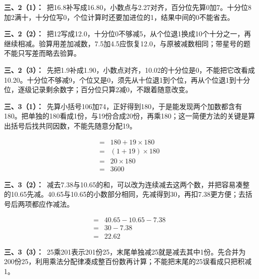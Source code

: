 \documentclass[multi=snippet,border=0pt]{standalone}
\newenvironment{snippet}[3]{\begin{minipage}{#1bp}\color{answerred}\fontsize{#2}{#3}\selectfont\raggedright}{\end{minipage}}
\begin{document}
\begin{snippet}{505}{11.5}{14}\textbf{三、2（1）：}\ 把16.8补写成16.80，小数点与2.27对齐，百分位先算0加7。十分位8加2满十，十分位写0，个位计算时还要加进位的1，结果中间的0不能省去。\end{snippet}
\begin{snippet}{505}{11.5}{14}\textbf{三、2（2）：}\ 把12写成12.0，十分位0不够减5，从个位退1换成10个十分之一，再继续相减。验算用差加减数，7.5加4.5应恢复12.0，与原被减数相同；带星号的题不能只写差而略去验算。\end{snippet}
\begin{snippet}{505}{11.5}{14}\textbf{三、2（3）：}\ 先把1.9补成1.90，小数点对齐，10.02的十分位是0，不能把它改看成10.20。十分位不够减9，个位又是0，须先从十位退1到个位，再从个位退1到十分位，逐级记录剩余数字；百分位只算2减0，不跟着随意改变。\end{snippet}
\begin{snippet}{505}{11.5}{14}\textbf{三、3（1）：}\ 先算小括号106加74，正好得到180，于是能发现两个加数都含有180。把单独的180看成1份，与19份合成20份，再乘180；这一简便方法的关键是算出括号后找共同因数，不能先随意分配19。\end{snippet}
\begin{snippet}{199.567}{10.5}{12.8}\[\begin{aligned}={}&180+19\times180\\={}&(1+19)\times180\\={}&20\times180\\={}&3600\end{aligned}\]\end{snippet}
\begin{snippet}{505}{11.5}{14}\textbf{三、3（2）：}\ 减去7.38与10.65的和，可以改为连续减去这两个数，并把容易凑整的10.65先减。40.65与10.65的小数部分相同，先减得到30，再扣7.38更方便；去括号后两项都应作减法。\end{snippet}
\begin{snippet}{191.233}{10.5}{12.8}\[\begin{aligned}={}&40.65-10.65-7.38\\={}&30-7.38\\={}&22.62\end{aligned}\]\end{snippet}
\begin{snippet}{505}{11.5}{14}\textbf{三、3（3）：}\ 25乘201表示201份25，末尾单独减25就是减去其中1份。先合并为200份25，利用乘法分配律凑成整百份数再计算；不能把末尾的25误看成只把积减1。\end{snippet}
\end{document}
